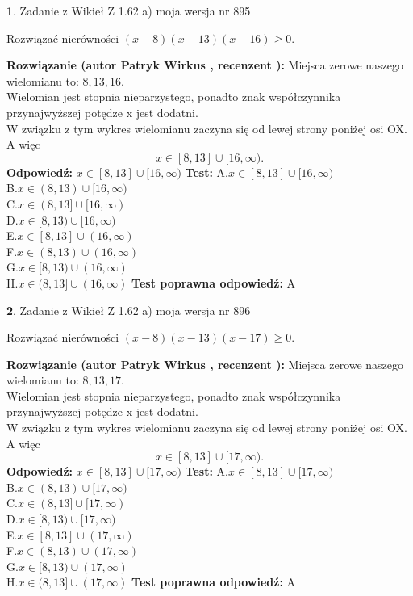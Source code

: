 \documentclass[12pt, a4paper]{article}
\theoremstyle{definition} %
\newtheorem{zad}{}
\newcommand{\zadStart}[1]{\begin{zad}#1\newline}
\newcommand{\zadStop}{\end{zad}}
\newcommand{\rozwStart}[2]{\noindent \textbf{Rozwiązanie (autor #1 , recenzent #2): }\newline}
\newcommand{\rozwStop}{\newline}
\newcommand{\odpStart}{\noindent \textbf{Odpowiedź:}\newline}
\newcommand{\odpStop}{\newline}
\newcommand{\testStart}{\noindent \textbf{Test:}\newline}
\newcommand{\testStop}{\newline}
\newcommand{\kluczStart}{\noindent \textbf{Test poprawna odpowiedź:}\newline}
\newcommand{\kluczStop}{\newline}
\begin{document}
\zadStart{Zadanie z Wikieł Z 1.62 a) moja wersja nr 895}

Rozwiązać nierówności $(x-8)(x-13)(x-16)\ge0$.
\zadStop
\rozwStart{Patryk Wirkus}{}
Miejsca zerowe naszego wielomianu to: $8, 13, 16$.\\
Wielomian jest stopnia nieparzystego, ponadto znak współczynnika przy\linebreak najwyższej potędze x jest dodatni.\\ W związku z tym wykres wielomianu zaczyna się od lewej strony poniżej osi OX. A więc $$x \in [8,13] \cup [16,\infty).$$
\rozwStop
\odpStart
$x \in [8,13] \cup [16,\infty)$
\odpStop
\testStart
A.$x \in [8,13] \cup [16,\infty)$\\
B.$x \in (8,13) \cup [16,\infty)$\\
C.$x \in (8,13] \cup [16,\infty)$\\
D.$x \in [8,13) \cup [16,\infty)$\\
E.$x \in [8,13] \cup (16,\infty)$\\
F.$x \in (8,13) \cup (16,\infty)$\\
G.$x \in [8,13) \cup (16,\infty)$\\
H.$x \in (8,13] \cup (16,\infty)$
\testStop
\kluczStart
A
\kluczStop



\zadStart{Zadanie z Wikieł Z 1.62 a) moja wersja nr 896}

Rozwiązać nierówności $(x-8)(x-13)(x-17)\ge0$.
\zadStop
\rozwStart{Patryk Wirkus}{}
Miejsca zerowe naszego wielomianu to: $8, 13, 17$.\\
Wielomian jest stopnia nieparzystego, ponadto znak współczynnika przy\linebreak najwyższej potędze x jest dodatni.\\ W związku z tym wykres wielomianu zaczyna się od lewej strony poniżej osi OX. A więc $$x \in [8,13] \cup [17,\infty).$$
\rozwStop
\odpStart
$x \in [8,13] \cup [17,\infty)$
\odpStop
\testStart
A.$x \in [8,13] \cup [17,\infty)$\\
B.$x \in (8,13) \cup [17,\infty)$\\
C.$x \in (8,13] \cup [17,\infty)$\\
D.$x \in [8,13) \cup [17,\infty)$\\
E.$x \in [8,13] \cup (17,\infty)$\\
F.$x \in (8,13) \cup (17,\infty)$\\
G.$x \in [8,13) \cup (17,\infty)$\\
H.$x \in (8,13] \cup (17,\infty)$
\testStop
\kluczStart
A
\kluczStop
\end{document}
